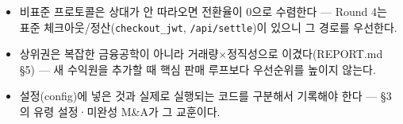 \documentclass[landscape,11pt]{article}
\begin{document}
\vspace{1.2mm}
\begin{itemize}[nosep,leftmargin=5mm]\footnotesize
\item 비표준 프로토콜은 상대가 안 따라오면 전환율이 0으로 수렴한다 --- Round 4는 표준 체크아웃/정산(\texttt{checkout\_jwt}, \texttt{/api/settle})이 있으니 그 경로를 우선한다.
\item 상위권은 복잡한 금융공학이 아니라 거래량$\times$정직성으로 이겼다(REPORT.md \S5) --- 새 수익원을 추가할 때 핵심 판매 루프보다 우선순위를 높이지 않는다.
\item 설정(config)에 넣은 것과 실제로 실행되는 코드를 구분해서 기록해야 한다 --- \S3의 유령 설정·미완성 M\&A가 그 교훈이다.
\end{itemize}
\end{document}
